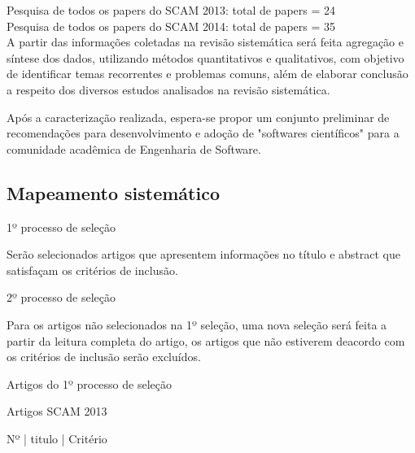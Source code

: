 \documentclass[12pt]{article}
\begin{document}
Pesquisa de todos os papers do SCAM 2013: total de papers = 24 \\
Pesquisa de todos os papers do SCAM 2014: total de papers = 35 \\

A partir das informações coletadas na revisão sistemática será feita agregação
e síntese dos dados, utilizando métodos quantitativos e qualitativos, com
objetivo de identificar temas recorrentes e problemas comuns, além de elaborar
conclusão a respeito dos diversos estudos analisados na revisão sistemática.

Após a caracterização realizada, espera-se propor um conjunto preliminar de
recomendações para desenvolvimento e adoção de "softwares científicos" para a
comunidade acadêmica de Engenharia de Software.

\subsection{Mapeamento sistemático}

1º processo de seleção

Serão selecionados artigos que apresentem informações no título e abstract que
satisfaçam os critérios de inclusão.

2º processo de seleção

Para os artigos não selecionados na 1º seleção, uma nova seleção será feita a
partir da leitura completa do artigo, os artigos que não estiverem deacordo
com os critérios de inclusão serão excluídos.

Artigos do 1º processo de seleção

Artigos SCAM 2013

Nº | titulo | Critério
\end{document}
